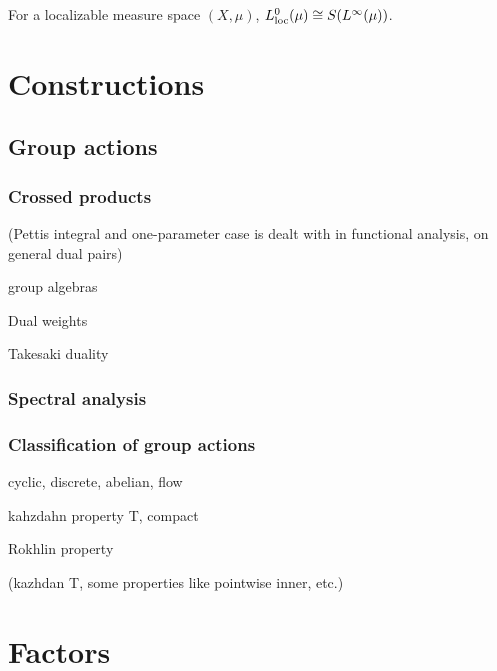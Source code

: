\documentclass{../../large}
\begin{document}
For a localizable measure space $(X,\mu)$, $L_{\mathrm{loc}}^0(\mu)\cong S(L^\infty(\mu))$.






\part{Constructions}




\chapter{Group actions}



\section{Crossed products}
(Pettis integral and one-parameter case is dealt with in functional analysis, on general dual pairs)

group algebras

Dual weights

Takesaki duality

\section{Spectral analysis}






\section{Classification of group actions}

cyclic, discrete, abelian, flow

kahzdahn property T, compact

Rokhlin property

(kazhdan T, some properties like pointwise inner, etc.)


\chapter{}
\chapter{}




\part{Factors}
\end{document}
